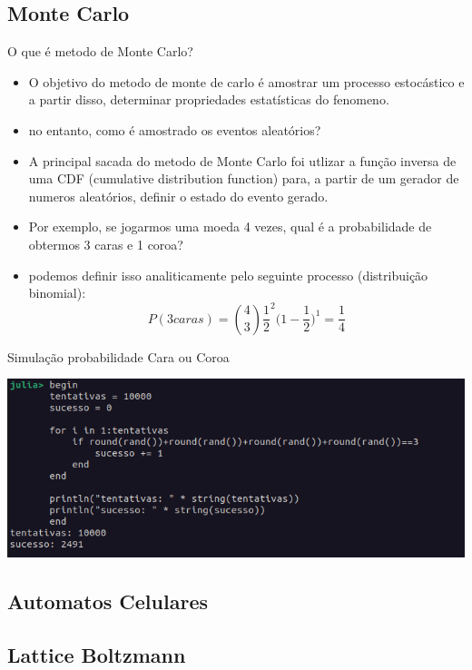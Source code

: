 \documentclass{beamer}
\begin{document}
		\subsection{Monte Carlo}
		\begin{frame}{O que é metodo de Monte Carlo?}
			\begin{itemize}[<+->]
				\item O objetivo do metodo de monte de carlo é amostrar um processo estocástico e a partir disso, determinar propriedades estatísticas do fenomeno.
				\item no entanto, como é amostrado os eventos aleatórios?
				\item A principal sacada do metodo de Monte Carlo foi utlizar a função inversa de uma CDF (cumulative distribution function) para, a partir de um gerador de numeros aleatórios, definir o estado do evento gerado.
				\item Por exemplo, se jogarmos uma moeda 4 vezes, qual é a probabilidade de obtermos 3 caras e 1 coroa?
				\item podemos definir isso analiticamente pelo seguinte processo (distribuição binomial):
				\begin{equation}
					P(3 caras) = \binom{4}{3}\frac{1}{2}^2\big(1-\frac{1}{2})^1 = \frac{1}{4}
				\end{equation}
			\end{itemize}
		\end{frame}
		\begin{frame}{Simulação probabilidade Cara ou Coroa}
		\begin{center}
			\includegraphics[width=\textwidth]{simul-monte-carlo}
		\end{center}
		\end{frame}
		\subsection{Automatos Celulares}
		\subsection{Lattice Boltzmann}
\end{document}
